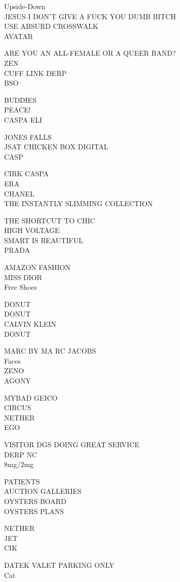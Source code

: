 \documentclass[10pt,letterpaper]{article}
\begin{document}
Upside{-}Down\\
JESUS I DON'T GIVE A FUCK YOU DUMB BITCH\\
USE ABSURD CROSSWALK\\
AVATAR

ARE YOU AN ALL{-}FEMALE OR A QUEER BAND?\\
ZEN\\
CUFF LINK DERP\\
BSO

BUDDIES\\
PEACE!\\
CASPA ELI

JONES FALLS\\
JSAT CHICKEN BOX DIGITAL\\
CASP

CIRK CASPA\\
ERA\\
CHANEL\\
THE INSTANTLY SLIMMING COLLECTION

THE SHORTCUT TO CHIC\\
HIGH VOLTAGE\\
SMART IS BEAUTIFUL\\
PRADA

AMAZON FASHION\\
MISS DIOR\\
Free Shoes

DONUT\\
DONUT\\
CALVIN KLEIN\\
DONUT

MARC BY MA RC JACOBS\\
Faces\\
ZENO\\
AGONY

MYBAD GEICO\\
CIRCUS\\
NETHER\\
EGO

VISITOR DGS DOING GREAT SERVICE\\
DERP NC\\
8mg/2mg

PATIENTS\\
AUCTION GALLERIES\\
OYSTERS BOARD\\
OYSTERS PLANS

NETHER\\
JET\\
CIK

DATEK VALET PARKING ONLY\\
Cat
\end{document}
